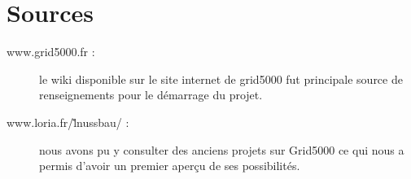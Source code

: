 \chapter{Sources}
\begin{description}
\item[www.grid5000.fr : ]le wiki disponible sur le site internet de grid5000 fut principale source de renseignements pour le démarrage du projet.
\item[www.loria.fr/\~ lnussbau/ : ]nous avons pu y consulter des anciens projets sur Grid5000 ce qui nous a permis d'avoir un premier aperçu de ses possibilités.

\end{description}
